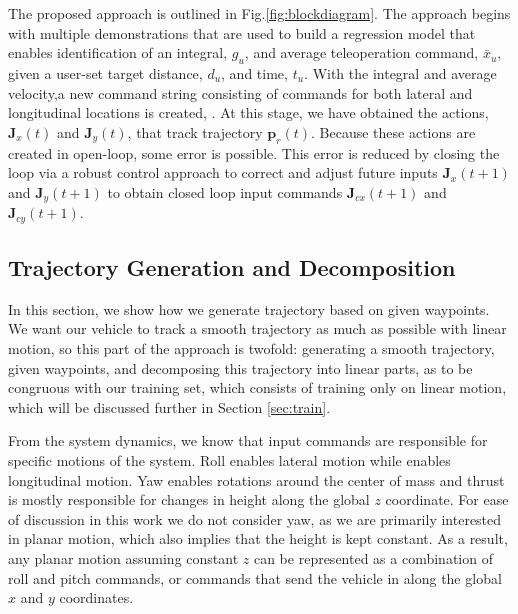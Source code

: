 \documentclass[letterpaper, 10 pt, conference]{ieeeconf}  %
\newcommand\NB[1]{$\spadesuit$\footnote{NB: #1}}
\begin{document}
The proposed approach is outlined in Fig.\ref{fig:blockdiagram}. The approach begins with multiple demonstrations that are used to  build a regression model that enables identification of an integral, $g_u$, and average teleoperation command, $\bar{x}_u$, given a user-set target distance, $d_u$, and time, $t_u$. With the integral and average velocity,a new command string consisting of commands for both lateral and longitudinal locations is created, . At this stage, we have obtained the actions, $\mathbf{J}_x(t)$ and $\mathbf{J}_y(t)$, that track trajectory $\mathbf{p}_r(t)$. Because these actions are created in open-loop, some error is possible. This error is reduced by closing the loop via a robust control approach to correct and adjust future inputs $\mathbf{J}_x(t+1)$ and $\mathbf{J}_y(t+1)$ to obtain closed loop input commands $\mathbf{J}_{cx}(t+1)$ and $\mathbf{J}_{cy}(t+1)$. %

    
\subsection{Trajectory Generation and Decomposition} \label{sec:traj}
In this section, we show how we generate trajectory based on given waypoints. We want our vehicle to track a smooth trajectory as much as possible with linear motion, so this part of the approach is twofold: generating a smooth trajectory, given waypoints, and decomposing this trajectory into linear parts, as to be congruous with our training set, which consists of training only on linear motion, which will be discussed further in Section \ref{sec:train}.

From the system dynamics, we know that input commands are responsible for specific motions of the system. Roll enables lateral motion while enables longitudinal motion. Yaw enables rotations around the center of mass and thrust is mostly responsible for changes in height along the global $z$ coordinate. For ease of discussion in this work we do not consider yaw, as we are primarily interested in planar motion, which also implies that the height is kept constant. As a result, any planar motion assuming constant $z$ can be represented as a combination of roll and pitch commands, or commands that send the vehicle in along the global $x$ and $y$ coordinates.
\end{document}
